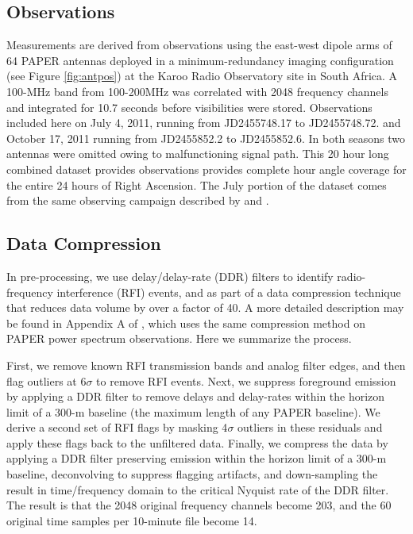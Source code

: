 \documentclass[preprint]{aastex}
\begin{document}
\subsection{Observations}

 Measurements are derived from observations using  the east-west dipole arms of
64 PAPER antennas deployed in a minimum-redundancy imaging configuration
(see Figure \ref{fig:antpos})
at the Karoo Radio Observatory site in South Africa.
A 100-MHz band from 100-200MHz was correlated
with 2048 frequency channels and integrated for 10.7 seconds before
visibilities were stored.  Observations included here on  July 4, 2011, running
from JD2455748.17 to JD2455748.72. and October 17, 2011 running from
JD2455852.2 to JD2455852.6.  In both seasons two antennas were omitted owing to
malfunctioning signal path. This 20 hour long combined dataset provides
observations provides complete hour angle coverage for the entire 24 hours of
Right Ascension. The July portion of the dataset comes from the same observing
campaign described by \cite{Pober:2013p9567} and \cite{Stefan:2012p9707}. 

\subsection{Data Compression}

In pre-processing, we use delay/delay-rate (DDR) filters
\citep{Parsons:2009p7859} to identify radio-frequency interference (RFI)
events, and as part of a data compression technique that reduces data volume by
over a factor of 40.  A more detailed description may be found in Appendix A of
\cite{Parsons2013b}, which uses the same compression method on PAPER power
spectrum observations. Here we summarize the process.

First, we remove known RFI transmission bands and analog filter edges, and then
flag outliers at 6$\sigma$ to remove RFI events.  Next, we suppress foreground
emission by applying a DDR filter to remove delays and delay-rates within the
horizon limit of a 300-m baseline (the maximum length of any PAPER baseline).
We derive a second set of RFI flags by masking 4$\sigma$ outliers in these
residuals and apply these flags back to the unfiltered data.  Finally, we
compress the data by applying a DDR filter preserving emission within the
horizon limit of a 300-m baseline, deconvolving to suppress flagging artifacts,
and down-sampling the result in time/frequency domain to the critical Nyquist
rate of the DDR filter.  The result is that the 2048 original frequency
channels become 203, and the 60 original time samples per 10-minute file become
14. 
\end{document}
